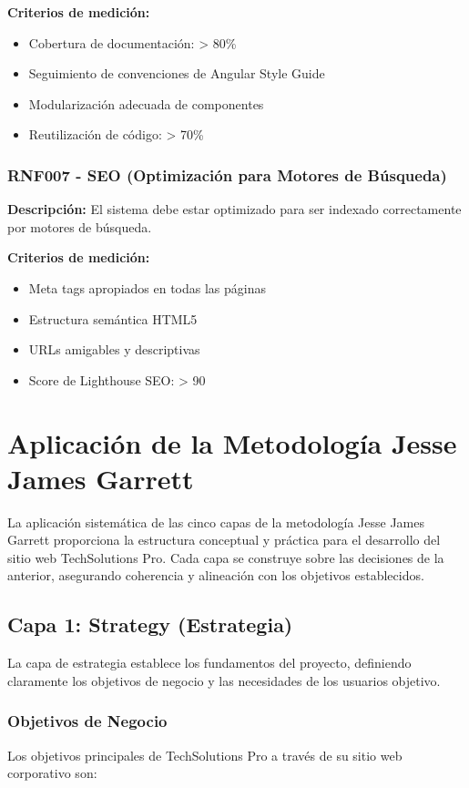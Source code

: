 \textbf{Criterios de medición:}
\begin{itemize}
    \item Cobertura de documentación: > 80\%
    \item Seguimiento de convenciones de Angular Style Guide
    \item Modularización adecuada de componentes
    \item Reutilización de código: > 70\%
\end{itemize}

\subsubsection{RNF007 - SEO (Optimización para Motores de Búsqueda)}
\textbf{Descripción:} El sistema debe estar optimizado para ser indexado correctamente por motores de búsqueda.

\textbf{Criterios de medición:}
\begin{itemize}
    \item Meta tags apropiados en todas las páginas
    \item Estructura semántica HTML5
    \item URLs amigables y descriptivas
    \item Score de Lighthouse SEO: > 90
\end{itemize}

\section{Aplicación de la Metodología Jesse James Garrett}

La aplicación sistemática de las cinco capas de la metodología Jesse James Garrett proporciona la estructura conceptual y práctica para el desarrollo del sitio web TechSolutions Pro. Cada capa se construye sobre las decisiones de la anterior, asegurando coherencia y alineación con los objetivos establecidos.

\subsection{Capa 1: Strategy (Estrategia)}

La capa de estrategia establece los fundamentos del proyecto, definiendo claramente los objetivos de negocio y las necesidades de los usuarios objetivo.

\subsubsection{Objetivos de Negocio}
Los objetivos principales de TechSolutions Pro a través de su sitio web corporativo son:

